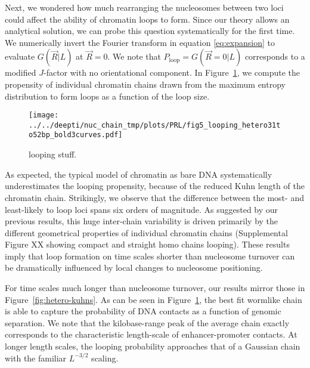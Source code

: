 \documentclass[%
 reprint,
superscriptaddress,
showpacs,preprintnumbers,
 amsmath,amssymb,
 aps,
 prl,
]{revtex4-1}
\newcommand{\greens}[2][\Omega_0; L]{G(#2|#1)}
\begin{document}
Next, we wondered how much rearranging the nucleosomes between two
    loci could affect the ability of chromatin loops to form.
Since our theory allows an analytical solution, we can probe this question
    systematically for the first time.
We numerically invert the Fourier transform in equation \ref{eq:expansion} to evaluate
    $\greens[L]{\vec{R}}$ at $\vec{R} = 0$.
We note that $P_\text{loop}=\greens[L]{\vec{R}=0}$ corresponds to a modified $J$-factor with no orientational component.
In Figure~\ref{fig:looping}, we compute the propensity of individual chromatin
    chains drawn from the maximum entropy distribution to form loops as a
    function of the loop size.

\begin{figure}
    \centering
    \texttt{[image: ../../deepti/nuc\_chain\_tmp/plots/PRL/fig5\_looping\_hetero31to52bp\_bold3curves.pdf]}
    \caption{looping stuff.}\label{fig:looping}
\end{figure}

As expected, the typical model of chromatin as bare DNA systematically
    underestimates the looping propensity, because of the reduced Kuhn length of
    the chromatin chain.
Strikingly, we observe that the difference between the most- and least-likely to
    loop loci spans six orders of magnitude.
As suggested by our previous results, this huge inter-chain variability is
    driven primarily by the different geometrical properties of individual
    chromatin chains (Supplemental Figure XX showing compact and straight homo chains
    looping).
These results imply that loop formation on time scales shorter than nucleosome
    turnover can be dramatically influenced by local changes to nucleosome
    positioning.

For time scales much longer than nucleosome turnover, our results mirror those
    in Figure~\ref{fig:hetero-kuhns}.
As can be seen in Figure~\ref{fig:looping}, the best fit wormlike chain is able
    to capture the probability of DNA contacts as a function of genomic separation.
We note that the kilobase-range peak of the average chain exactly corresponds to
    the characteristic length-scale of enhancer-promoter contacts.
At longer length scales, the looping probability approaches that of a Gaussian
    chain with the familiar $L^{-3/2}$ scaling.
\end{document}
